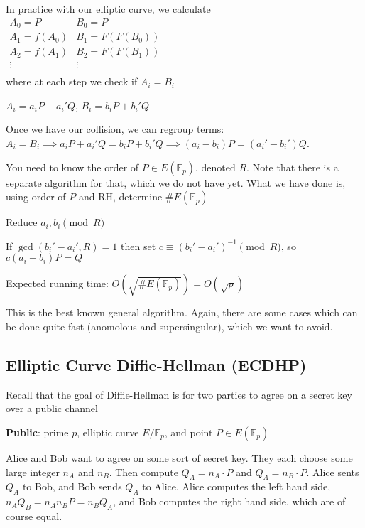 \documentclass[10pt]{article}
\newcommand{\F}{\mathbb{F}}
\begin{document}
In practice with our elliptic curve, we calculate\\
$\begin{matrix}
    A_0 = P & B_0 = P\\
    A_1 = f(A_0) & B_1 = F(F(B_0))\\
    A_2 = f(A_1) & B_2 = F(F(B_1))\\
    \vdots & \vdots\\
\end{matrix}$\\
where at each step we check if $A_i = B_i$

\begin{rmk}
    $A_i = a_i P + a_i'Q$, $B_i = b_iP + b_i'Q$
\end{rmk}

Once we have our collision, we can regroup terms: $A_i = B_i \implies a_i P + a_i'Q = b_iP + b_i'Q \implies (a_i - b_i)P = (a_i' - b_i')Q$.

\begin{rmk}
    You need to know the order of $P \in E(\F_p)$, denoted $R$. Note that there is a separate algorithm for that, which we do not have yet. What we have done is, using order of $P$ and RH, determine $\#E(\F_p)$
\end{rmk}

Reduce $a_i, b_i \pmod{R}$

If $\gcd(b_i' -a_i', R) = 1$ then set $c \equiv (b_i' - a_i')^{-1}\pmod{R}$, so $c(a_i-b_i)P = Q$

Expected running time: $O(\sqrt{\# E(\F_p)}) = O(\sqrt{p})$

\begin{rmk}
    This is the best known general algorithm. Again, there are some cases which can be done quite fast (anomolous and supersingular), which we want to avoid.
\end{rmk}

\subsection{Elliptic Curve Diffie-Hellman (ECDHP)} Recall that the goal of Diffie-Hellman is for two parties to agree on a secret key over a public channel

\textbf{Public}: prime $p$, elliptic curve $E/\F_p$, and point $P \in E(\F_p)$

Alice and Bob want to agree on some sort of secret key. They each choose some large integer $n_A$ and $n_B$. Then compute $Q_A = n_A \cdot P$ and $Q_A = n_B \cdot P$. Alice sents $Q_A$ to Bob, and Bob sends $Q_A$ to Alice. Alice computes the left hand side, $n_AQ_B = n_An_BP = n_BQ_A$, and Bob computes the right hand side, which are of course equal.
\end{document}
